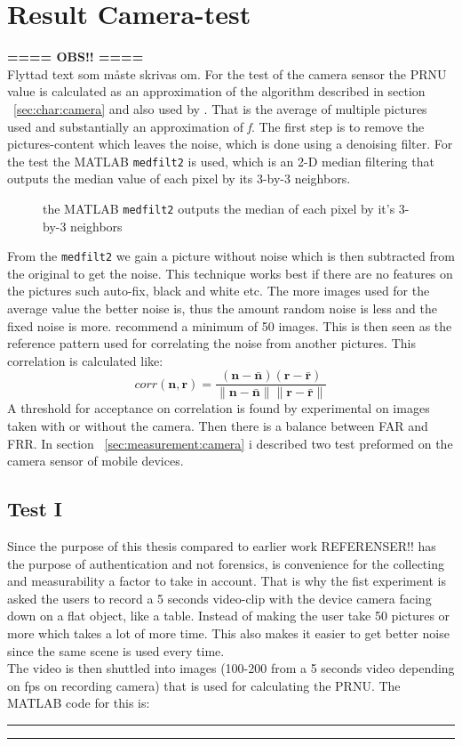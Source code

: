 \section{Result Camera-test}\label{sec:ResCam}
\textbf{ ==== OBS!! ====}\\ Flyttad text som måste skrivas om.
For the test of the camera sensor the PRNU value is calculated as an approximation of the algorithm described in section ~\ref{sec:char:camera} and also used by \cite{sensor:camera:DCIdent}. That is the average of multiple pictures used and substantially an approximation of \textit{f}. The first step is to remove the pictures-content which leaves the noise, which is done using a denoising filter. For the test the MATLAB \texttt{medfilt2} is used, which is an 2-D median filtering that outputs the median value of each pixel by its 3-by-3 neighbors. 
\begin{figure}[H]
  \centering
  
  \caption{\label{fig:medfilt2} the MATLAB \texttt{medfilt2} outputs the median of each pixel by it's 3-by-3 neighbors}
\end{figure}
From the \texttt{medfilt2} we gain a picture without noise which is then subtracted from the original to get the noise. This technique works best if there are no features on the pictures such auto-fix, black and white etc. The more images used for the average value the better noise is, thus the amount random noise is less and the fixed noise is more. \cite{sensor:camera:DCIdent} recommend a minimum of 50 images. This is then seen as the reference pattern used for correlating the noise from another pictures. This correlation is calculated like:
$$
corr(\boldsymbol{n},\boldsymbol{r}) = 
\frac{(\boldsymbol{n} - \bar{\boldsymbol{n}})(\boldsymbol{r} - \bar{\boldsymbol{r}})}
{\|\boldsymbol{n} - \bar{\boldsymbol{n}}\| \|\boldsymbol{r} - \bar{\boldsymbol{r}}\|}
$$
A threshold for acceptance on correlation is found by experimental on images taken with or without the camera. Then there is a balance between FAR and FRR. 
In section ~\ref{sec:measurement:camera} i described two test preformed on the camera sensor of mobile devices.
\subsection{Test I}
Since the purpose of this thesis compared to earlier work REFERENSER!! has the purpose of authentication and not forensics, is convenience for the collecting and measurability a factor to take in account. That is why the fist experiment is asked the users to record a 5 seconds video-clip with the device camera facing down on a flat object, like a table. Instead of making the user take 50 pictures or more which takes a lot of more time. This also makes it easier to get better noise since the same scene is used every time. \\
The video is then shuttled into images (100-200 from a 5 seconds video depending on fps on recording camera) that is used for calculating the PRNU. The MATLAB code for this is:\\
\rule{\textwidth}{0.5pt}
  
\rule{\textwidth}{0.5pt}

